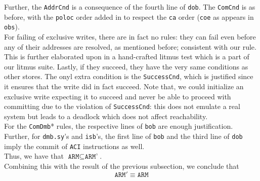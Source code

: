\documentclass{article}
\newcommand{\var}{\texttt}
\begin{document}
Further, the \var{AddrCnd} is a consequence of the fourth line of \var{dob}. The \var{ComCnd} is as before, with the \var{poloc} order added in to respect the \var{ca} order (\var{coe} as appears in \var{obs}).\\
For failing of exclusive writes, there are in fact no rules: they can fail even before any of their addresses are resolved, as mentioned before; consistent with our rule. This is further elaborated upon in a hand-crafted litmus test which is a part of our litmus suite. Lastly, if they succeed, they have the very same conditions as other stores. The onyl extra condition is the \var{SuccessCnd}, which is justified since it ensures that the write did in fact succeed. Note that, we could initialize an exclusive write expecting it to succeed and never be able to proceed with committing due to the violation of \var{SuccessCnd}: this does not emulate a real system but leads to a deadlock which does not affect reachability.\\
For the \var{ComDmb}* rules, the respective lines of \var{bob} are enough justification. Further, for \var{dmb.sy}'s and \var{isb}'s, the first line of \var{bob} and the third line of \var{dob} imply the commit of \var{ACI} instructions as well.\\
Thus, we have that $\var{ARM} \subseteq \var{ARM'}$.\\
Combining this with the result of the previous subsection, we conclude that
$$\boxed{\var{ARM}' \equiv \var{ARM}} $$
\end{document}
